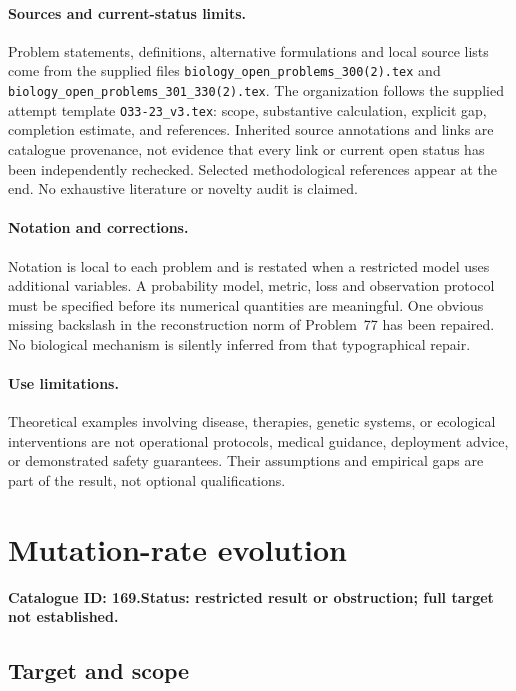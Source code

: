 \documentclass[11pt]{article}
\begin{document}
\paragraph{Sources and current-status limits.}
Problem statements, definitions, alternative formulations and local source lists
come from the supplied files
\texttt{biology\_open\_problems\_300(2).tex} and
\texttt{biology\_open\_problems\_301\_330(2).tex}.
The organization follows the supplied attempt template
\texttt{O33-23\_v3.tex}: scope, substantive calculation, explicit gap,
completion estimate, and references. Inherited source annotations and links are
catalogue provenance, not evidence that every link or current open status has
been independently rechecked. Selected methodological references appear at the
end. No exhaustive literature or novelty audit is claimed.

\paragraph{Notation and corrections.}
Notation is local to each problem and is restated when a restricted model uses
additional variables. A probability model, metric, loss and observation protocol
must be specified before its numerical quantities are meaningful. One obvious
missing backslash in the reconstruction norm of Problem~77 has been repaired.
No biological mechanism is silently inferred from that typographical repair.

\paragraph{Use limitations.}
Theoretical examples involving disease, therapies, genetic systems, or ecological
interventions are not operational protocols, medical guidance, deployment advice,
or demonstrated safety guarantees. Their assumptions and empirical gaps are part
of the result, not optional qualifications.

\setcounter{section}{168}
\section{Mutation-rate evolution}
\label{prob:169}
\noindent\textbf{Catalogue ID: 169.}\quad \textbf{Status: restricted result or obstruction; full target not established.}
\subsection{Target and scope}
\end{document}
